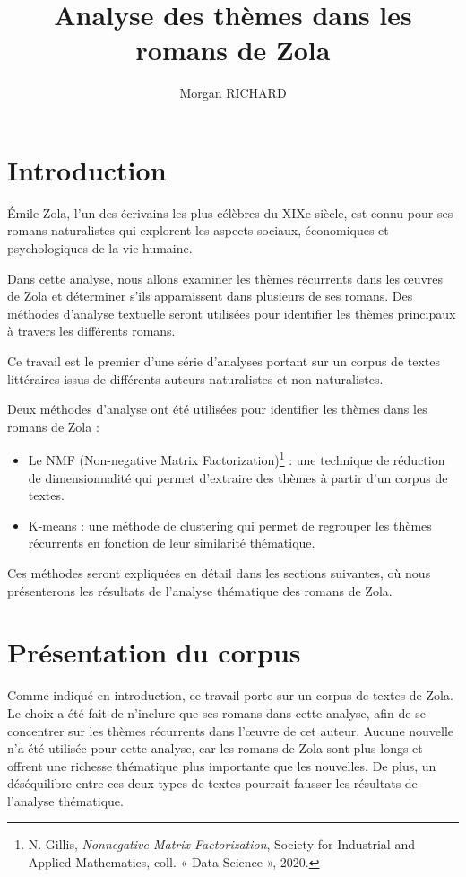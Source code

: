 \documentclass{article}
\title{Analyse des thèmes dans les romans de Zola}
\author{Morgan RICHARD}
\date{}
\begin{document}
\maketitle

\section{Introduction}

Émile Zola, l'un des écrivains les plus célèbres du XIXe siècle, est connu pour ses romans naturalistes qui explorent les aspects sociaux, économiques et psychologiques de la vie humaine. 

Dans cette analyse, nous allons examiner les thèmes récurrents dans les œuvres de Zola et déterminer s'ils apparaissent dans plusieurs de ses romans. Des méthodes d'analyse textuelle seront utilisées pour identifier les thèmes principaux à travers les différents romans.

Ce travail est le premier d'une série d'analyses portant sur un corpus de textes littéraires issus de différents auteurs naturalistes et non naturalistes.

Deux méthodes d'analyse ont été utilisées pour identifier les thèmes dans les romans de Zola : 
\vspace{0.5cm}
\begin{itemize}
\item Le NMF (Non-negative Matrix Factorization)\footnote{N. Gillis, \textit{Nonnegative Matrix Factorization}, Society for Industrial and Applied Mathematics, coll. « Data Science », 2020.} : une technique de réduction de dimensionnalité qui permet d'extraire des thèmes à partir d'un corpus de textes. 

\item K-means : une méthode de clustering qui permet de regrouper les thèmes récurrents en fonction de leur similarité thématique.
\end{itemize}
\vspace{0.5cm}
Ces méthodes seront expliquées en détail dans les sections suivantes, où nous présenterons les résultats de l'analyse thématique des romans de Zola.

\newpage
\section{Présentation du corpus}

Comme indiqué en introduction, ce travail porte sur un corpus de textes de Zola. Le choix a été fait de n'inclure que ses romans dans cette analyse, afin de se concentrer sur les thèmes récurrents dans l'œuvre de cet auteur. Aucune nouvelle n'a été utilisée pour cette analyse, car les romans de Zola sont plus longs et offrent une richesse thématique plus importante que les nouvelles. De plus, un déséquilibre entre ces deux types de textes pourrait fausser les résultats de l'analyse thématique.
\end{document}

